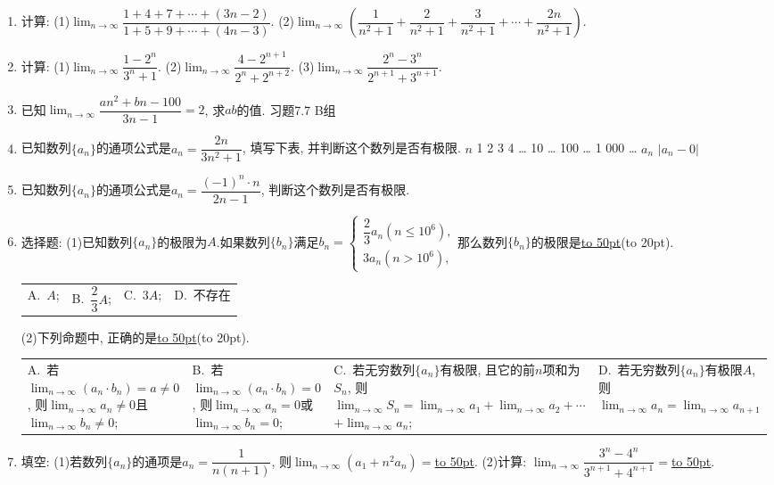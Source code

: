 \documentclass[10pt,a4paper]{article}
\newcommand{\blank}[1]{\underline{\hbox to #1pt{}}}
\newcommand{\bracket}[1]{(\hbox to #1pt{})}
\newcommand{\fourch}[4]{\par\begin{tabular}{p{.23\textwidth}p{.23\textwidth}p{.23\textwidth}p{.23\textwidth}}
A.~#1 &B.~#2& C.~#3& D.~#4
\end{tabular}}
\begin{document}
\begin{enumerate}[1.]
(2)计算: $\displaystyle\lim_{n\to\infty}\dfrac{7n+4}{5-3n}=$\blank{50}.
(3)计算: $\displaystyle\lim_{n\to\infty}[(3-\dfrac 2n)(5+\dfrac 3n)]=$\blank{50}.
(4)计算: $\displaystyle\lim_{n\to\infty}\dfrac{2{n^2}+n-3}{3{n^2}+n-2}=$\blank{50}.
(5)计算: $\displaystyle\lim_{n\to\infty}\dfrac{(n+3)(n-4)}{(n-1)(3-2n)}=$\blank{50}.
\item 计算:
(1)$\displaystyle\lim_{n\to\infty}\dfrac{1+4+7+\cdots +(3n-2)}{1+5+9+\cdots +(4n-3)}$.
(2)$\displaystyle\lim_{n\to\infty}(\dfrac 1{n^2+1}+\dfrac 2{n^2+1}+\dfrac 3{n^2+1}+\cdots +\dfrac{2n}{{n^2}+1})$.
\item 计算:
(1)$\displaystyle\lim_{n\to\infty}\dfrac{1-{2^n}}{{3^n}+1}$.
(2)$\displaystyle\lim_{n\to\infty}\dfrac{4-{2^{n+1}}}{{2^n}+{2^{n+2}}}$.
(3)$\displaystyle\lim_{n\to\infty}\dfrac{{2^n}-{3^n}}{{2^{n+1}}+{3^{n+1}}}$.
\item 已知$\displaystyle\lim_{n\to\infty}\dfrac{a{n^2}+bn-100}{3n-1}=2$, 求$ab$的值.
习题7.7  B组
\item 已知数列$\{a_n\}$的通项公式是$a_n=\dfrac{2n}{3{n^2}+1}$, 填写下表, 并判断这个数列是否有极限.
$n$	1	2	3	4	…	10	…	100	…	1 000	…
$a_n$											
$|a_n-0|$											
\item 已知数列$\{a_n\}$的通项公式是$a_n=\dfrac{{{(-1)}^n}\cdot n}{2n-1}$, 判断这个数列是否有极限.
\item 选择题:
(1)已知数列$\{a_n\}$的极限为$A$.如果数列$\{b_n\}$满足$b_n=\begin{cases}
    \dfrac 23a_n  (n\le 10^6),  \\3a_n  (n>10^6),  \end{cases}$那么数列$\{b_n\}$的极限是\blank{50}\bracket{20}.
\fourch{$A$;}{$\dfrac 23A$;}{$3A$;}{不存在}
(2)下列命题中, 正确的是\blank{50}\bracket{20}.
\fourch{若$\displaystyle\lim_{n\to\infty}(a_n\cdot b_n)=a\ne 0$, 则$\displaystyle\lim_{n\to\infty}a_n\ne 0$且$\displaystyle\lim_{n\to\infty}b_n\ne 0$;}{若$\displaystyle\lim_{n\to\infty}(a_n\cdot b_n)=0$, 则$\displaystyle\lim_{n\to\infty}a_n=0$或$\displaystyle\lim_{n\to\infty}b_n=0$;}{若无穷数列$\{a_n\}$有极限, 且它的前$n$项和为$S_n$, 则$\displaystyle\lim_{n\to\infty}S_n=\displaystyle\lim_{n\to\infty}a_1+\displaystyle\lim_{n\to\infty}a_2+\cdots$ $+\displaystyle\lim_{n\to\infty}a_n$;}{若无穷数列$\{a_n\}$有极限$A$, 则$\displaystyle\lim_{n\to\infty}a_n=\displaystyle\lim_{n\to\infty}a_{n+1}$}
\item 填空:
(1)若数列$\{a_n\}$的通项是$a_n=\dfrac 1{n(n+1)}$, 则$\displaystyle\lim_{n\to\infty}(a_1+n^2a_n)=$\blank{50}.
(2)计算: $\displaystyle\lim_{n\to\infty}\dfrac{{3^n}-{4^n}}{{3^{n+1}}+{4^{n+1}}}=$\blank{50}.

\end{enumerate}
\end{document}
